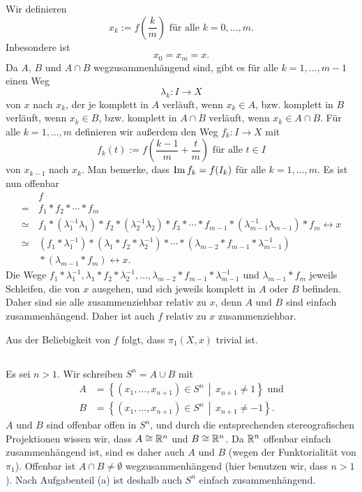 \documentclass[a4paper,10pt]{article}
\begin{document}
Wir definieren
\[
 x_k := f\left( \frac{k}{m} \right) \text{ für alle } k = 0, \ldots, m.
\]
Inbesondere ist
\[
 x_0 = x_m = x.
\]
Da $A$, $B$ und $A \cap B$ wegzusammenhängend sind, gibt es für alle $k = 1, \ldots, m-1$ einen Weg
\[
 \lambda_k : I \to X
\]
von $x$ nach $x_k$, der je komplett in $A$ verläuft, wenn $x_k \in A$, bzw. komplett in $B$ verläuft, wenn $x_k \in B$, bzw. komplett in $A \cap B$ verläuft, wenn $x_k \in A \cap B$. Für alle $k = 1, \ldots, m$ definieren wir außerdem den Weg $f_k : I \to X$ mit
\[
 f_k(t) := f\left( \frac{k-1}{m} + \frac{t}{m} \right) \text{ für alle } t \in I
\]
von $x_{k-1}$ nach $x_k$. Man bemerke, dass  $\operatorname{Im} f_k = f(I_k)$ für alle $k = 1, \ldots, m$.
Es ist nun offenbar
\begin{align*}
 &\, f \\
 =&\, f_1 * f_2 * \cdots * f_m \\
 \simeq&\, f_1 * \left( \lambda_1^{-1} \lambda_1 \right) * f_2 * \left( \lambda_2^{-1} \lambda_2 \right) * f_3 * \cdots * f_{m-1} * \left( \lambda_{m-1}^{-1} \lambda_{m-1} \right) * f_m \rel x\\
 \simeq&\, \left( f_1 * \lambda_1^{-1} \right) * \left( \lambda_1 * f_2 * \lambda_2^{-1} \right) * \cdots * \left( \lambda_{m-2} * f_{m-1} * \lambda_{m-1}^{-1} \right) \\
  &\, * \left( \lambda_{m-1} * f_m \right) \rel x.
\end{align*}
Die Wege $f_1 * \lambda_1^{-1}, \lambda_1 * f_2 * \lambda_2^{-1}, \ldots, \lambda_{m-2} * f_{m-1} * \lambda_{m-1}^{-1}$ und $\lambda_{m-1} * f_m$ jeweils Schleifen, die von $x$ ausgehen, und sich jeweils komplett in $A$ oder $B$ befinden. Daher sind sie alle zusammenziehbar relativ zu $x$, denn $A$ und $B$ sind einfach zusammenhängend. Daher ist auch $f$ relativ zu $x$ zusammenziehbar.

Aus der Beliebigkeit von $f$ folgt, dass $\pi_1(X,x)$ trivial ist.


\subsection{}
Es sei $n > 1$. Wir schreiben $S^n = A \cup B$ mit
\begin{align*}
 A &= \left\{ (x_1, \ldots, x_{n+1}) \in S^n \,\middle|\, x_{n+1} \neq 1 \right\} \text{ und} \\
 B &= \left\{ (x_1, \ldots, x_{n+1}) \in S^n \,\middle|\, x_{n+1} \neq -1 \right\}.
\end{align*}
$A$ und $B$ sind offenbar offen in $S^n$, und durch die entsprechenden stereografischen Projektionen wissen wir, dass $A \cong \mathbb{R}^n$ und $B \cong \mathbb{R}^n$. Da $\mathbb{R}^n$ offenbar einfach zusammenhängend ist, sind es daher auch $A$ und $B$ (wegen der Funktorialität von $\pi_1$). Offenbar ist $A \cap B \neq \emptyset$ wegzusammenhängend (hier benutzen wir, dass $n > 1$). Nach Aufgabenteil (a) ist deshalb auch $S^n$ einfach zusammenhängend.
\end{document}
